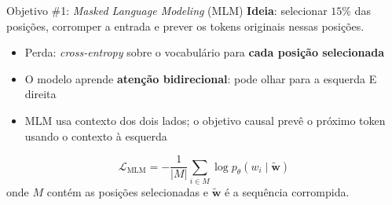 \documentclass[aspectratio=169, xcolor=dvipsnames]{beamer}
\begin{document}
  \begin{frame}{Objetivo \#1: \textit{Masked Language Modeling} (MLM)}
    \textbf{Ideia}: selecionar $15\%$ das posições, corromper a entrada
    e prever os tokens originais nessas posições.

    \vspace{0.5em}
    \centering
    \vspace{0.5em}
    \begin{itemize}
      \item Perda: \textit{cross-entropy} sobre o vocabulário para \textbf{cada posição selecionada}
      \item O modelo aprende \textbf{atenção bidirecional}: pode olhar para a esquerda E direita
      \item MLM usa contexto dos dois lados; o objetivo causal prevê o próximo token usando o contexto à esquerda
    \end{itemize}
    \[
      \mathcal{L}_{\text{MLM}} = -\frac{1}{|M|} \sum_{i \in M} \log p_\theta(w_i \mid \tilde{\mathbf w})
    \]
    onde $M$ contém as posições selecionadas e $\tilde{\mathbf w}$ é a sequência corrompida.
  \end{frame}
\end{document}
